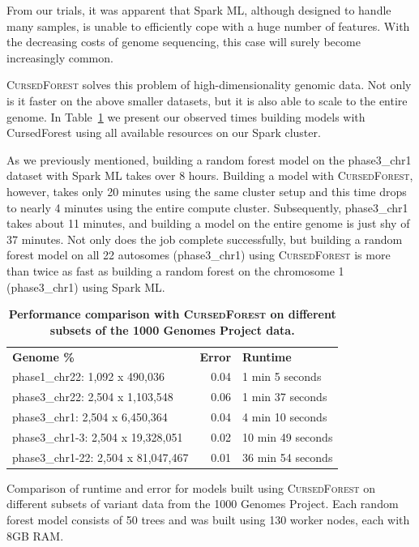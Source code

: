 \documentclass[10pt,letterpaper]{article}
\newlength\savedwidth
\newcommand\thickhline{\noalign{\global\savedwidth\arrayrulewidth\global\arrayrulewidth 2pt}%
\hline
\noalign{\global\arrayrulewidth\savedwidth}}
\newcommand{\cursedforest}{\textsc{CursedForest}\xspace}
\begin{document}
From our trials, it was apparent that Spark ML, although designed to handle many samples, is unable to efficiently cope
with a huge number of features. With the decreasing costs of genome sequencing, this case will surely become increasingly
common.

\cursedforest solves this problem of high-dimensionality genomic data. Not only is it faster on the above smaller datasets,
but it is also able to scale to the entire genome. In Table~\ref{cursedforesttable} we present our observed times building
models with CursedForest using all available resources on our Spark cluster.

As we previously mentioned, building a random forest model on the phase3\_chr1 dataset with Spark ML takes over 8 hours.
Building a model with \cursedforest, however, takes only 20 minutes using the same cluster setup and this time drops to
nearly 4 minutes using the entire compute cluster. Subsequently, phase3\_chr1 takes about 11 minutes, and building a
model on the entire genome is just shy of 37 minutes. Not only does the job complete successfully, but building a random
forest model on all 22 autosomes (phase3\_chr1) using \cursedforest is more than twice as fast as building a random
forest on the chromosome 1 (phase3\_chr1) using Spark ML.


\begin{table}[!ht]
\begin{minipage}{\textwidth}
\centering
\caption{ {\bf Performance comparison with \cursedforest on different subsets of the 1000 Genomes Project data.}}
\begin{tabular}{| l | r | l |}
\hline
{\bf Genome \%} & {\bf Error} & {\bf Runtime} \\ \thickhline
phase1\_chr22: 1,092 x 490,036 & 0.04 & 1 min 5 seconds \\ \hline
phase3\_chr22: 2,504 x 1,103,548 & 0.06 & 1 min 37 seconds \\ \hline
phase3\_chr1: 2,504 x 6,450,364 & 0.04 & 4 min 10 seconds \\ \hline
phase3\_chr1-3: 2,504 x 19,328,051 & 0.02 & 10 min 49 seconds \\ \hline
phase3\_chr1-22: 2,504 x 81,047,467 & 0.01 & 36 min 54 seconds \\ \hline
\end{tabular}
\begin{flushleft} 
Comparison of runtime and error for models built using \cursedforest on different subsets of variant data 
from the 1000 Genomes Project.
Each random forest model consists of 50 trees and was built using 130 worker nodes, each with 8GB RAM.
\end{flushleft}
\label{cursedforesttable}
\end{minipage}
\end{table}
\end{document}
